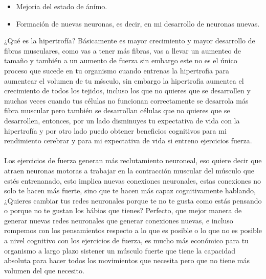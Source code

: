 \documentclass{article}
\begin{document}
\begin{itemize}
\item Mejoria del estado de ánímo.
\item Formación de nuevas neuronas, es decir, en mi desarrollo de neuronas nuevas.
\end{itemize}
¿Qué es la hipertrofía? Básicamente es mayor crecimiento y mayor desarrollo de fibras musculares, como vas a tener más fibras, vas a llevar un aumenteo de tamaño y también a un aumento de fuerza sin embargo este no es el único proceso que sucede en tu organismo cuando entrenas la hipertrofia para aumentear el volumen de tu mśsculo, sin embargo la hipertrofia aumentea el crecimiento de todos los tejidos, incluso los que no quieres que se desarrollen y muchas veces cuando tus células no funcionan correctamente se desarrola más fibra muscular pero también se desarrollan células que no quieres que se desarrollen, entonces, por un lado disminuyes tu expectativa de vida con la hipertrofía y por otro lado puedo obtener beneficios cognitivos para mi rendimiento cerebrar y para mi expectativa de vida si entreno ejercicios fuerza.\\
\\
Los ejercicios de fuerza generan más reclutamiento neuroneal, eso quiere decir que atraen neuronas motoras a trabajar en la contracción muscular del músculo que estés entrenanado, esto implica nuevas conexiones neuronales, estas conexiones no solo te hacen más fuerte, sino que te hacen más capaz cognitivamente hablando, ¿Quieres cambiar tus redes neuronales porque te no te gusta como estás pensando o porque no te gustan los hábios que tienes? Perfecto, que mejor manera de generar nuevas redes neuronales que generar conexiones nuevas, e incluso rompemos con los pensamientos respecto a lo que es posible o lo que no es posible a nivel cognitivo con los ejercicios de fuerza, es mucho más económico para tu organismo a largo plazo sistener un músculo fuerte que tiene la capacidad absoluta para hacer todos los movimientos que necesita pero que no tiene más volumen del que necesito.
\end{document}
